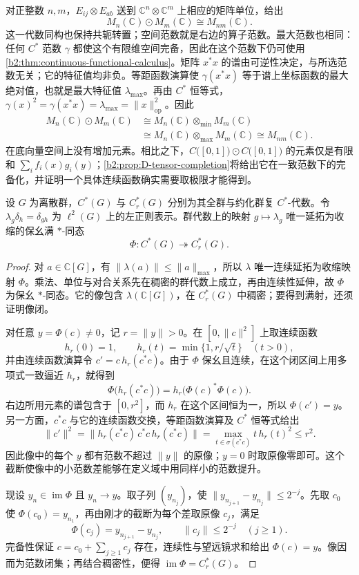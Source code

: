 \ProseParagraphBreak
对正整数 \(n,m\)，\(E_{ij}\otimes E_{ab}\) 送到 \(\mathbb C^n\otimes\mathbb C^m\) 上相应的矩阵单位，给出
\[
	M_n(\mathbb C)\odot M_m(\mathbb C)\cong M_{nm}(\mathbb C).
\]
这一代数同构也保持共轭转置；空间范数就是右边的算子范数。最大范数也相同：任何 \(C^*\) 范数 \(\gamma\) 都使这个有限维空间完备，因此在这个范数下仍可使用\cref{b2:thm:continuous-functional-calculus}。矩阵 \(x^*x\) 的谱由可逆性决定，与所选范数无关；它的特征值均非负。等距函数演算使 \(\gamma(x^*x)\) 等于谱上坐标函数的最大绝对值，也就是最大特征值 \(\lambda_{\max}\)。再由 \(C^*\) 恒等式，\(\gamma(x)^2=\gamma(x^*x)=\lambda_{\max}=\|x\|_{\mathrm{op}}^2\)。因此
\[
	\begin{aligned}
		M_n(\mathbb C)\odot M_m(\mathbb C) &\cong M_n(\mathbb C)\otimes_{\min}M_m(\mathbb C)\\
		&\cong M_n(\mathbb C)\otimes_{\max}M_m(\mathbb C) \cong M_{nm}(\mathbb C).
	\end{aligned}
\]
在底向量空间上没有增加元素。相比之下，\(C\bigl([0,1]\bigr)\odot C\bigl([0,1]\bigr)\) 的元素仅是有限和 \(\sum_i f_i(x)g_i(y)\)；\cref{b2:prop:D-tensor-completion}将给出它在一致范数下的完备化，并证明一个具体连续函数确实需要取极限才能得到。

\begin{proposition}\label{b2:prop:D-group-full-reduced-quotient}
	设 \(G\) 为离散群，\(C^*(G)\) 与 \(C_r^*(G)\) 分别为其全群与约化群复 \(C^*\)-代数。令 \(\lambda_g\delta_h=\delta_{gh}\) 为 \(\ell^2(G)\) 上的左正则表示。群代数上的映射 \(g\mapsto\lambda_g\) 唯一延拓为收缩的保幺满 \(*\)-同态
	\[
		\Phi:C^*(G)\twoheadrightarrow C_r^*(G).
	\]
\end{proposition}
\begin{proof}
	对 \(a\in\mathbb C[G]\)，有 \(\|\lambda(a)\|\le\|a\|_{\max}\)，所以 \(\lambda\) 唯一连续延拓为收缩映射 \(\Phi\)。乘法、单位与对合关系先在稠密的群代数上成立，再由连续性延伸，故 \(\Phi\) 为保幺 \(*\)-同态。它的像包含 \(\lambda(\mathbb C[G])\)，在 \(C_r^*(G)\) 中稠密；要得到满射，还须证明像闭。

	对任意 \(y=\Phi(c)\ne0\)，记 \(r=\|y\|>0\)。在 \([0,\|c\|^2]\) 上取连续函数
	\[
		h_r(0)=1,\qquad h_r(t)=\min\{1,r/\sqrt t\}\quad(t>0),
	\]
	并由连续函数演算令 \(c'=c\,h_r(c^*c)\)。由于 \(\Phi\) 保幺且连续，在这个闭区间上用多项式一致逼近 \(h_r\)，就得到
	\[
		\Phi\bigl(h_r(c^*c)\bigr)=h_r\bigl(\Phi(c)^*\Phi(c)\bigr).
	\]
	右边所用元素的谱包含于 \([0,r^2]\)，而 \(h_r\) 在这个区间恒为一，所以 \(\Phi(c')=y\)。另一方面，\(c^*c\) 与它的连续函数交换，等距函数演算及 \(C^*\) 恒等式给出
	\[
		\|c'\|^2 =\bigl\|h_r(c^*c)\,c^*c\,h_r(c^*c)\bigr\| =\max_{t\in\sigma(c^*c)} t\,h_r(t)^2 \le r^2.
	\]
	因此像中的每个 \(y\) 都有范数不超过 \(\|y\|\) 的原像；\(y=0\) 时取原像零即可。这个截断使像中的小范数差能够在定义域中用同样小的范数提升。

	现设 \(y_n\in\operatorname{im}\Phi\) 且 \(y_n\to y\)。取子列 \((y_{n_j})\)，使 \(\|y_{n_{j+1}}-y_{n_j}\|\le2^{-j}\)。先取 \(c_0\) 使 \(\Phi(c_0)=y_{n_1}\)，再由刚才的截断为每个差取原像 \(c_j\)，满足
	\[
		\Phi(c_j)=y_{n_{j+1}}-y_{n_j},\qquad \|c_j\|\le2^{-j} \quad(j\ge1).
	\]
	完备性保证 \(c=c_0+\sum_{j\ge1}c_j\) 存在，连续性与望远镜求和给出 \(\Phi(c)=y\)。像因而为范数闭集；再结合稠密性，便得 \(\operatorname{im}\Phi=C_r^*(G)\)。
\end{proof}

